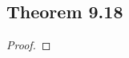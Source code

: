 \documentclass[../../main.tex]{subfiles}
\begin{document}
\subsection{Theorem 9.18}
\begin{wts}

\end{wts}
\begin{proof}

\end{proof}
\end{document}
